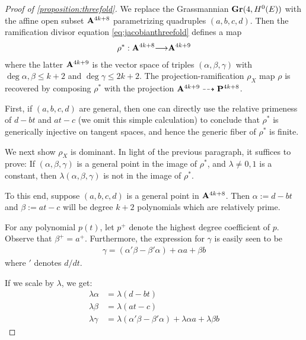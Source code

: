 \documentclass[11pt,reqno]{amsart}
\theoremstyle{plain}
\theoremstyle{definition}
\theoremstyle{remark}
\numberwithin{equation}{section}
\renewcommand{\to}{{\longrightarrow}}
\numberwithin{equation}{section}
\begin{document}
\begin{proof}[Proof of \autoref{proposition:threefold}]
	We replace the Grassmannian ${\bf Gr}(4,H^{0}(E))$ with the affine open subset ${\bf A}^{4k+8}$ parametrizing quadruples $(a,b,c,d)$. Then the ramification divisor equation \eqref{eq:jacobianthreefold} defines a map 
	\begin{align*}
	 	\rho^{*}: \A^{4k+8} \to \A^{4k+9}
	 \end{align*} 
	 where the latter ${\bf A}^{4k+9}$ is the vector space of triples $(\alpha,\beta,\gamma)$ with $\deg \alpha, \beta \leq k+2$ and $\deg \gamma \leq 2k+2$. The projection-ramification $\rho_{X}$ map $\rho$ is recovered by composing $\rho^{*}$ with the projection ${\bf A}^{4k+9} \dashrightarrow {\bf P}^{4k+8}$. 

	 First, if $(a,b,c,d)$ are general, then one can directly use the relative primeness of $d-bt$ and $at-c$ (we omit this simple calculation) to conclude that $\rho^{*}$ is generically injective on tangent spaces, and hence the generic fiber of $\rho^{*}$ is finite.


	 We next show  $\rho_{X}$ is dominant. In light of the previous paragraph, it suffices to prove: If $(\alpha, \beta, \gamma)$ is a general point in the image of $\rho^{*}$, and $\lambda \neq 0,1$ is a constant, then $\lambda(\alpha, \beta, \gamma)$ is not in the image of $\rho^{*}$. 

	 To this end, suppose $(a,b,c,d)$ is a general point in ${\bf A}^{4k+8}$. Then  $\alpha := d-bt$ and $\beta := at-c$ will be degree $k+2$ polynomials which are relatively prime.  


	 For any polynomial $p(t)$, let $p^{+}$ denote the highest degree coefficient of $p$. Observe that $\beta^{+} = a^{+}$.  Furthermore, the expression for $\gamma$ is easily seen to be 
	 \begin{align}\label{gammaEq}
	  	\gamma = (\alpha'\beta - \beta' \alpha) + \alpha a + \beta b
	  \end{align} 
	  where $'$ denotes $d/dt$. 

	  If we scale by $\lambda$, we get: 
	  \begin{align}
	      \label{firstEquations}
	  	\lambda \alpha &= \lambda (d-bt)\\
	  	\lambda \beta &= \lambda (at-c) \nonumber\\
	  	\lambda \gamma &= \lambda(\alpha'\beta - \beta' \alpha) + \lambda \alpha a + \lambda \beta b \nonumber
	  \end{align}


\end{proof}
\end{document}

